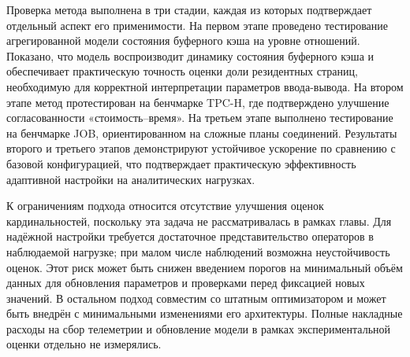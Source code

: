 Проверка метода выполнена в три стадии, каждая из которых подтверждает отдельный аспект его применимости. На первом этапе проведено тестирование агрегированной модели состояния буферного кэша на уровне отношений. Показано, что модель воспроизводит динамику состояния буферного кэша и обеспечивает практическую точность оценки доли резидентных страниц, необходимую для корректной интерпретации параметров ввода-вывода. На втором этапе метод протестирован на бенчмарке TPC-H, где подтверждено улучшение согласованности «стоимость–время». На третьем этапе выполнено тестирование на бенчмарке JOB, ориентированном на сложные планы соединений. Результаты второго и третьего этапов демонстрируют устойчивое ускорение по сравнению с базовой конфигурацией, что подтверждает практическую эффективность адаптивной настройки на аналитических нагрузках.

К ограничениям подхода относится отсутствие улучшения оценок кардинальностей, поскольку эта задача не рассматривалась в рамках главы. Для надёжной настройки требуется достаточное представительство операторов в наблюдаемой нагрузке; при малом числе наблюдений возможна неустойчивость оценок. Этот риск может быть снижен введением порогов на минимальный объём данных для обновления параметров и проверками перед фиксацией новых значений. В остальном подход совместим со штатным оптимизатором и может быть внедрён с минимальными изменениями его архитектуры. Полные накладные расходы на сбор телеметрии и обновление модели в рамках экспериментальной оценки отдельно не измерялись.

\FloatBarrier
